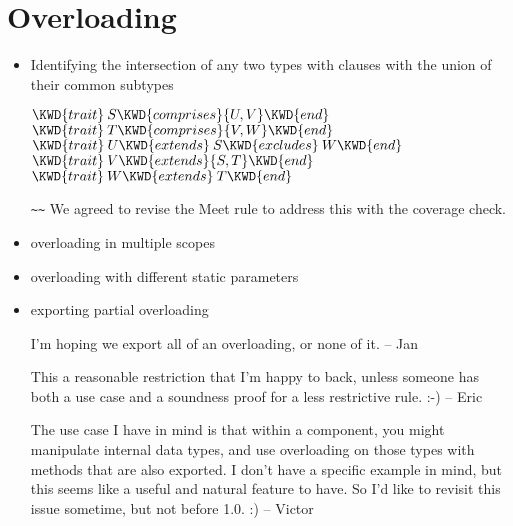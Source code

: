 \section{Overloading}
\begin{itemize}
\item Identifying the intersection of any two types with  clauses with the union of their common subtypes

\begin{Fortress}
\(\KWD{trait}\:S \KWD{comprises} \{U, V\} \KWD{end}\)\\
\(\KWD{trait}\:T \KWD{comprises} \{V, W\} \KWD{end}\)\\
\(\KWD{trait}\:U \KWD{extends}\:S \KWD{excludes}\:W \KWD{end}\)\\
\(\KWD{trait}\:V \KWD{extends} \{S, T\} \KWD{end}\)\\
\(\KWD{trait}\:W \KWD{extends}\:T \KWD{end}\)
\end{Fortress}

 \verb+~~+ 
We agreed to revise the Meet rule to address this with the coverage check.

  \item overloading in multiple scopes
  \item overloading with different static parameters
  \item exporting partial overloading

I'm hoping we export all of an overloading, or none of it. -- Jan

This a reasonable restriction that I'm happy to back, unless someone
has both a use case and a soundness proof for a less restrictive
rule. :-) -- Eric

The use case I have in mind is that within a component, you might
manipulate internal data types, and use overloading on those types
with methods that are also exported.  I don't have a specific example
in mind, but this seems like a useful and natural feature to have.  So
I'd like to revisit this issue sometime, but not before 1.0. :) -- Victor

\end{itemize}


